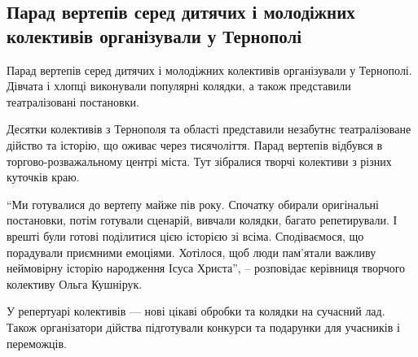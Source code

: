 
 
 
 
 
 
\subsection{Парад вертепів серед дитячих і молодіжних колективів організували у Тернополі}
\label{sec:25_01_2022.stz.news.ua.zzte.1.parad_vertepov_ternopol}
 

\begin{zznagolos}
Парад вертепів серед дитячих і молодіжних колективів організували у Тернополі.
Дівчата і хлопці виконували популярні колядки, а також представили
театралізовані постановки.
\end{zznagolos}


Десятки колективів з Тернополя та області представили незабутнє театралізоване
дійство та історію, що оживає через тисячоліття. Парад вертепів відбувся в
торгово-розважальному центрі міста. Тут зібралися творчі колективи з різних
куточків краю.


\enquote{Ми готувалися до вертепу майже пів року. Спочатку обирали оригінальні
постановки, потім готували сценарій, вивчали колядки, багато репетирували. І
врешті були готові поділитися цією історією зі всіма. Сподіваємося, що
порадували приємними емоціями. Хотілося, щоб люди пам’ятали важливу неймовірну
історію народження Ісуса Христа}, – розповідає керівниця творчого колективу
Ольга Кушнірук.


У репертуарі колективів —  нові цікаві обробки та колядки на сучасний лад.
Також організатори дійства підготували конкурси та подарунки для учасників і
переможців.
